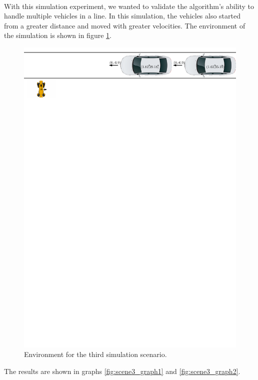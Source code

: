        \\
            With this simulation experiment, we wanted to validate the algorithm's ability to handle multiple vehicles in a line. In this simulation, the vehicles also started from a greater distance and moved with greater velocities. The environment of the simulation is shown in figure \ref{fig:scene3}.\\
            \begin{figure}[H]
                \centering
                \includegraphics[width=\linewidth]{images/simulations/scene3.pdf}
                \caption{Environment for the third simulation scenario.}
                \label{fig:scene3}
            \end{figure}
            The results are shown in graphs \ref{fig:scene3_graph1} and \ref{fig:scene3_graph2}.
